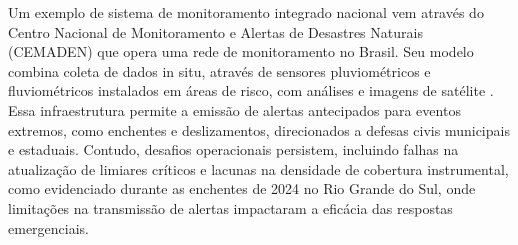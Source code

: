 Um exemplo de sistema de monitoramento integrado nacional vem através do Centro Nacional de Monitoramento e Alertas de
Desastres Naturais (CEMADEN) que opera uma rede de monitoramento no Brasil. Seu modelo combina coleta de dados in situ,
através de sensores pluviométricos e fluviométricos instalados em áreas de risco, com análises e imagens de satélite
\cite{cemadem}. Essa infraestrutura permite a emissão de alertas antecipados para eventos extremos, como enchentes e
deslizamentos, direcionados a defesas civis municipais e estaduais. Contudo, desafios operacionais persistem, incluindo
falhas na atualização de limiares críticos e lacunas na densidade de cobertura instrumental, como evidenciado durante as
enchentes de 2024 no Rio Grande do Sul, onde limitações na transmissão de alertas impactaram a eficácia das respostas
emergenciais.

